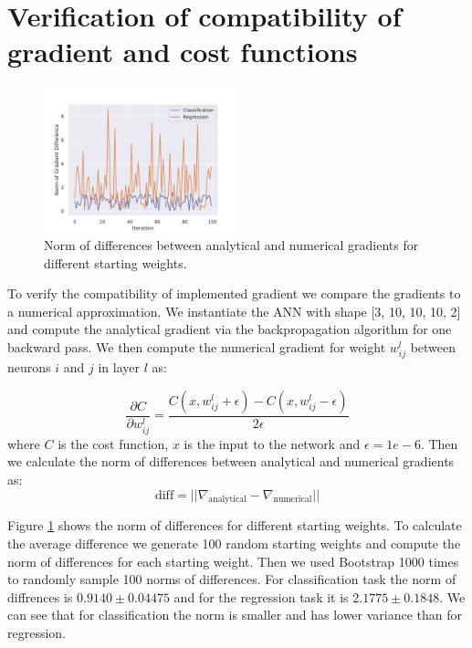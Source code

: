 \documentclass[9pt]{IEEEtran}
\begin{document}
\section{Verification of compatibility of gradient and cost functions}
\begin{figure}[!ht]
    \centering
    \includegraphics[width=0.5\textwidth]{grad_verification.pdf}
    \caption{Norm of differences between analytical and numerical gradients for different starting weights.}
    \label{fig:grad_verification}
\end{figure}
To verify the compatibility of implemented gradient we compare the gradients to a numerical approximation.
We instantiate the ANN with shape [3, 10, 10, 10, 2] and compute the analytical gradient via the backpropagation algorithm for one backward pass.
We then compute the numerical gradient for weight $w_{ij}^{l}$ between neurons $i$ and $j$ in layer $l$ as:

\begin{equation}
    \frac{\partial C}{\partial w_{ij}^{l}} = \frac{C(x, w_{ij}^{l} + \epsilon) - C(x, w_{ij}^{l} - \epsilon)}{2\epsilon}
\end{equation}    
where $C$ is the cost function, $x$ is the input to the network and $\epsilon = 1e-6$. 
Then we calculate the norm of differences between analytical and numerical gradients as:
\begin{equation}
    \text{diff} = || \nabla_{\text{analytical}} - \nabla_{\text{numerical}} ||
\end{equation}


Figure \ref{fig:grad_verification} shows the norm of differences for different starting weights.
To calculate the average difference we generate 100 random starting weights and compute the norm of differences for each starting weight.
Then we used Bootstrap 1000 times to randomly sample 100 norms of differences.
For classification task the norm of diffrences is $0.9140 \pm 0.04475$ and for the regression task it is $2.1775 \pm 0.1848$.
We can see that for classification the norm is smaller and has lower variance than for regression.
\end{document}

